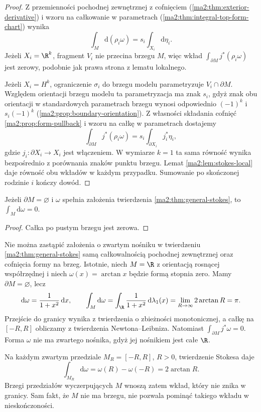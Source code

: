 \begin{proof}
Z przemienności pochodnej zewnętrznej z cofnięciem
(\ref{ma2:thm:exterior-derivative}) i wzoru
na całkowanie w parametrach
(\ref{ma2:thm:integral-top-form-chart}) wynika
\[
 \int_M\mathrm d(\rho_i\omega)
 =s_i\int_{X_i}\mathrm d\eta_i.
\]
Jeżeli $X_i=\R^k$, fragment $V_i$ nie przecina
brzegu $M$, więc wkład $\int_{\partial M}
j^*(\rho_i\omega)$ jest zerowy, podobnie jak
prawa strona z lematu lokalnego.

Jeżeli $X_i=H^k$, ograniczenie $\sigma_i$
do brzegu modelu parametryzuje $V_i\cap\partial M$.
Względem orientacji brzegu modelu ta parametryzacja
ma znak $s_i$, gdyż znak obu orientacji
w standardowych parametrach brzegu wynosi
odpowiednio $(-1)^k$ i $s_i(-1)^k$
(\ref{ma2:prop:boundary-orientation}).
Z własności składania cofnięć
\ref{ma2:prop:form-pullback} i wzoru na całkę
w parametrach dostajemy
\[
 \int_{\partial M}j^*(\rho_i\omega)
 =s_i\int_{\partial X_i}j_i^*\eta_i,
\]
gdzie $j_i:\partial X_i\to X_i$ jest włączeniem.
W wymiarze $k=1$ ta sama równość wynika
bezpośrednio z porównania znaków punktu brzegu.
Lemat \ref{ma2:lem:stokes-local} daje
równość obu wkładów w każdym przypadku.
Sumowanie po skończonej rodzinie $i$ kończy dowód.
\end{proof}

\begin{wniosek}
\label{ma2:cor:stokes-no-boundary}
Jeżeli $\partial M=\varnothing$ i $\omega$
spełnia założenia twierdzenia
\ref{ma2:thm:general-stokes}, to
$\int_M\mathrm d\omega=0$.
\end{wniosek}
\begin{proof}
Całka po pustym brzegu jest zerowa.
\end{proof}

\begin{przyklad}
\label{ma2:ex:stokes-noncompact-support}
Nie można zastąpić założenia o zwartym nośniku
w twierdzeniu \ref{ma2:thm:general-stokes}
samą całkowalnością pochodnej zewnętrznej
oraz cofnięcia formy na brzeg.
Istotnie, niech $M=\R$ z orientacją rosnącej
współrzędnej i niech $\omega(x)=\arctan x$
będzie formą stopnia zero.
Mamy $\partial M=\varnothing$, lecz
\[
 \mathrm d\omega=\frac{1}{1+x^2}\,\mathrm dx,\qquad
 \int_M\mathrm d\omega
 =\int_{\R}\frac{1}{1+x^2}\,\mathrm d\lambda_1(x)
 =\lim_{R\to\infty}2\arctan R=\pi.
\]
Przejście do granicy wynika z twierdzenia
o zbieżności monotonicznej, a całkę na
$[-R,R]$ obliczamy z twierdzenia
Newtona--Leibniza. Natomiast
$\int_{\partial M}j^*\omega=0$.
Forma $\omega$ nie ma zwartego nośnika,
gdyż jej nośnikiem jest całe $\R$.

Na każdym zwartym przedziale $M_R=[-R,R]$,
$R>0$, twierdzenie Stokesa daje
\[
 \int_{M_R}\mathrm d\omega
 =\omega(R)-\omega(-R)=2\arctan R.
\]
Brzegi przedziałów wyczerpujących $M$
wnoszą zatem wkład, który nie znika w granicy.
Sam fakt, że $M$ nie ma brzegu, nie pozwala
pominąć takiego wkładu w nieskończoności.
\end{przyklad}

